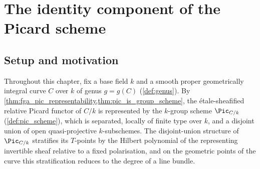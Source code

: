 \chapter{The identity component of the Picard scheme}
\label{chap:Picard_IdentityComponent}
\providecommand{\connComp}{\operatorname{Comp}}

%


\section{Setup and motivation}
\label{sec:pic0_setup}

Throughout this chapter, fix a base field \(k\) and a smooth proper
geometrically integral curve \(C\) over \(k\) of genus \(g = g(C)\)
(\cref{def:genus}). By
\cref{thm:fga_pic_representability,thm:pic_is_group_scheme}, the
\'etale-sheafified relative Picard functor of \(C/k\) is represented by
the \(k\)-group scheme \(\Pic_{C/k}\) (\cref{def:pic_scheme}), which is
separated, locally of finite type over \(k\), and a disjoint union of
open quasi-projective \(k\)-subschemes. The disjoint-union structure of
\(\Pic_{C/k}\) stratifies its \(T\)-points by the Hilbert polynomial of the
representing invertible sheaf relative to a fixed polarisation, and on
the geometric points of the curve this stratification reduces to the
degree of a line bundle.

